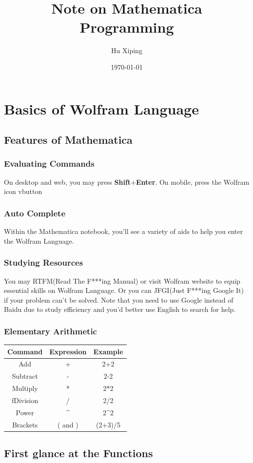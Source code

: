 \documentclass[a4paper]{book}
\begin{document}
\sffamily
\author{Hu Xiping}
\title{Note on Mathematica Programming}
\date{\today}
\maketitle
\tableofcontents
\part{Basics of Wolfram Language}
\chapter{Features of Mathematica}
\section{Evaluating Commands}
On desktop and web, you may press \textbf{Shift}+\textbf{Enter}. On mobile, press the Wolfram icon vbutton
\section{Auto Complete}
Within the Mathematica notebook, you'll see a variety of aids to help you enter the Wolfram Language.
\section{Studying Resources}
You may RTFM(Read The F***ing Manual) or visit Wolfram website to equip essential skills on Wolfram Language. Or you can JFGI(Just F***ing Google It) if your problem can't be solved. Note that you need to use Google instead of Baidu due to study efficiency and you'd better use English to search for help.
\section{Elementary Arithmetic}
\begin{tabular}{|c|c|c|}
\hline 
Command & Expression & Example \\ 
\hline 
Add & + & 2+2 \\ 
\hline
Subtract & - & 2-2 \\ 
\hline
Multiply & * & 2*2 \\ 
\hline
fDivision & / & 2/2 \\ 
\hline
Power & \^{} & 2\^{}2 \\ 
\hline
Brackets & ( and ) & (2+3)/5 \\
\hline
\end{tabular} 
\chapter{First glance at the Functions}
\end{document}
